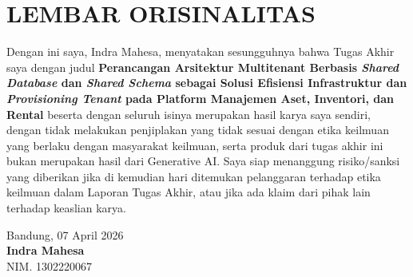 \chapter*{LEMBAR ORISINALITAS}

Dengan ini saya, Indra Mahesa, menyatakan sesungguhnya bahwa Tugas Akhir saya dengan judul
\textbf{Perancangan Arsitektur Multitenant Berbasis \textit{Shared Database} dan \textit{Shared Schema}
sebagai Solusi Efisiensi Infrastruktur dan \textit{Provisioning Tenant} pada Platform Manajemen Aset,
Inventori, dan Rental} beserta dengan seluruh isinya merupakan hasil karya saya sendiri, dengan tidak
melakukan penjiplakan yang tidak sesuai dengan etika keilmuan yang berlaku dengan masyarakat keilmuan,
serta produk dari tugas akhir ini bukan merupakan hasil dari Generative AI. Saya siap menanggung
risiko/sanksi yang diberikan jika di kemudian hari ditemukan pelanggaran terhadap etika keilmuan dalam
Laporan Tugas Akhir, atau jika ada klaim dari pihak lain terhadap keaslian karya.

\vspace{2cm}

\begin{flushright}
  Bandung, 07 April 2026 \\[2cm]
  \textbf{Indra Mahesa} \\
  NIM. 1302220067
\end{flushright}
